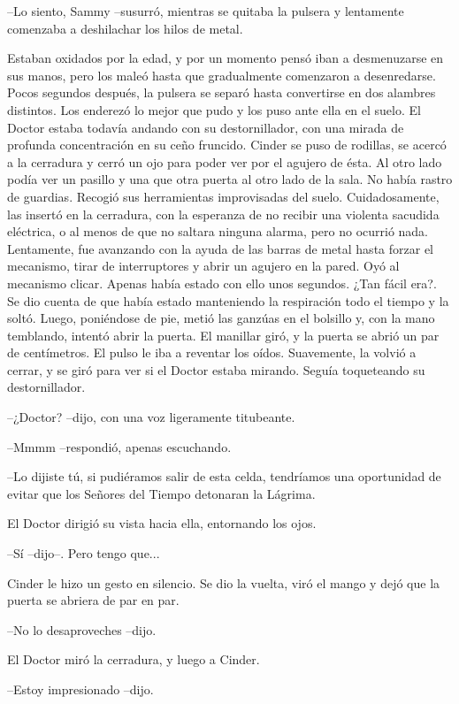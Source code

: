 --Lo siento, Sammy --susurró, mientras se quitaba la pulsera y lentamente comenzaba a deshilachar los hilos de metal.

Estaban oxidados por la edad, y por un momento pensó iban a desmenuzarse en sus manos, pero los maleó hasta que gradualmente comenzaron a desenredarse.
Pocos segundos después, la pulsera se separó hasta convertirse en dos alambres distintos. Los enderezó lo mejor que pudo y los puso ante ella en el suelo. El Doctor estaba todavía andando con su destornillador, con una mirada de profunda concentración en su ceño fruncido.
Cinder se puso de rodillas, se acercó a la cerradura y cerró un ojo para poder ver por el agujero de ésta. Al otro lado podía ver un pasillo y una que otra puerta al otro lado de la sala. No había rastro de guardias. Recogió sus herramientas improvisadas del suelo. Cuidadosamente, las insertó en la cerradura, con la esperanza de no recibir una violenta sacudida eléctrica, o al menos de que no saltara ninguna alarma, pero no ocurrió nada. Lentamente, fue avanzando con la ayuda de las barras de metal hasta forzar el mecanismo, tirar de interruptores y abrir un agujero en la pared. Oyó al mecanismo clicar. Apenas había estado con ello unos segundos. ¿Tan fácil era?.
Se dio cuenta de que había estado manteniendo la respiración todo el tiempo y la soltó. Luego, poniéndose de pie, metió las ganzúas en el bolsillo y, con la mano temblando, intentó abrir la puerta. El manillar giró, y la puerta se abrió un par de centímetros. El pulso le iba a reventar los oídos. Suavemente, la volvió a cerrar, y se giró para ver si el Doctor estaba mirando. Seguía toqueteando su destornillador.

--¿Doctor? --dijo, con una voz ligeramente titubeante.

--Mmmm --respondió, apenas escuchando. 

--Lo dijiste tú, si pudiéramos salir de esta celda, tendríamos una oportunidad de evitar que los Señores del Tiempo detonaran la Lágrima.

El Doctor dirigió su vista hacia ella, entornando los ojos.

--Sí --dijo--. Pero tengo que...

Cinder le hizo un gesto en silencio. Se dio la vuelta, viró el mango y dejó que la puerta se abriera de par en par.

--No lo desaproveches --dijo.

El Doctor miró la cerradura, y luego a Cinder.

--Estoy impresionado --dijo.

